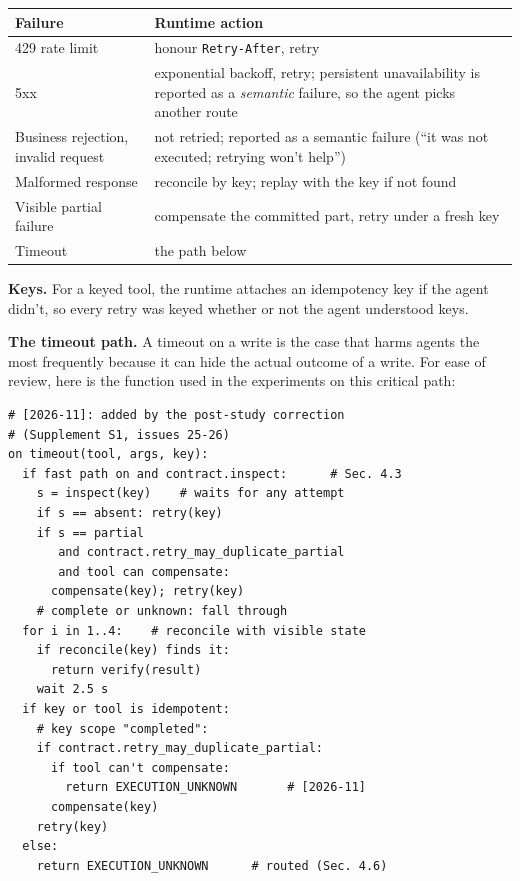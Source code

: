 \documentclass[letterpaper,twocolumn,10pt]{article}
\begin{document}
\begin{table}[t]
\centering
\footnotesize
\begin{tabularx}{\textwidth}{XX}
\toprule
\textbf{Failure} & \textbf{Runtime action} \\
\midrule
429 rate limit & honour \texttt{Retry-After}, retry \\
5xx & exponential backoff, retry; persistent unavailability is reported as a \emph{semantic} failure, so the agent picks another route \\
Business rejection, invalid request & not retried; reported as a semantic failure (``it was not executed; retrying won't help'') \\
Malformed response & reconcile by key; replay with the key if not found \\
Visible partial failure & compensate the committed part, retry under a fresh key \\
Timeout & the path below \\
\bottomrule
\end{tabularx}

\end{table}

\textbf{Keys.} For a keyed tool, the runtime attaches an idempotency key if the agent didn't, so every retry was keyed whether or not the agent understood keys.

\textbf{The timeout path.} A timeout on a write is the case that harms agents the most frequently because it can hide the actual outcome of a write. For ease of review, here is the function used in the experiments on this critical path:

\begin{Verbatim}[breaklines,samepage=true,fontsize=\footnotesize]
# [2026-11]: added by the post-study correction
# (Supplement S1, issues 25-26)
on timeout(tool, args, key):
  if fast path on and contract.inspect:      # Sec. 4.3
    s = inspect(key)    # waits for any attempt
    if s == absent: retry(key)
    if s == partial
       and contract.retry_may_duplicate_partial
       and tool can compensate:
      compensate(key); retry(key)
    # complete or unknown: fall through
  for i in 1..4:    # reconcile with visible state
    if reconcile(key) finds it:
      return verify(result)
    wait 2.5 s
  if key or tool is idempotent:
    # key scope "completed":
    if contract.retry_may_duplicate_partial:
      if tool can't compensate:
        return EXECUTION_UNKNOWN       # [2026-11]
      compensate(key)
    retry(key)
  else:
    return EXECUTION_UNKNOWN      # routed (Sec. 4.6)
\end{Verbatim}
\end{document}
